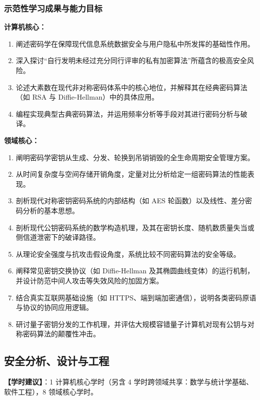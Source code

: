 \subsubsection{示范性学习成果与能力目标}
\textbf{计算机核心：}
\begin{enumerate}\setlength{\itemsep}{0pt}\setlength{\parskip}{0pt}
    \item 阐述密码学在保障现代信息系统数据安全与用户隐私中所发挥的基础性作用。
    \item 深入探讨“自行发明未经过充分同行评审的私有加密算法”所蕴含的极高安全风险。
    \item 论述大素数在现代非对称密码体系中的核心地位，并解释其在经典密码算法（如 RSA 与 Diffie-Hellman）中的具体应用。
    \item 编程实现典型古典密码算法，并运用频率分析等手段对其进行密码分析与破译。
\end{enumerate}
\textbf{领域核心：}
\begin{enumerate}\setlength{\itemsep}{0pt}\setlength{\parskip}{0pt}\setcounter{enumi}{4}
    \item 阐明密码学密钥从生成、分发、轮换到吊销销毁的全生命周期安全管理方案。
    \item 从时间复杂度与空间存储开销角度，定量对比分析给定一组密码算法的性能表现。
    \item 剖析现代对称密钥密码系统的内部结构（如 AES 轮函数）以及线性、差分密码分析的基本思想。
    \item 剖析现代公钥密码系统的数学构造机理，及其在密钥长度、随机数质量失当或侧信道泄密下的破译路径。
    \item 从理论安全强度与抗攻击假设角度，系统比较不同密码算法的安全等级。
    \item 阐释常见密钥交换协议（如 Diffie-Hellman 及其椭圆曲线变体）的运行机制，并设计防范中间人攻击等失效风险的加固方案。
    \item 结合真实互联网基础设施（如 HTTPS、端到端加密通信），说明各类密码原语与协议的协同应用逻辑。
    \item 研讨量子密钥分发的工作机理，并评估大规模容错量子计算机对现有公钥与对称密码算法的颠覆性冲击。
\end{enumerate}

\subsection{安全分析、设计与工程}
\textbf{【学时建议】}：1 计算机核心学时（另含 4 学时跨领域共享：数学与统计学基础、软件工程），8 领域核心学时。

